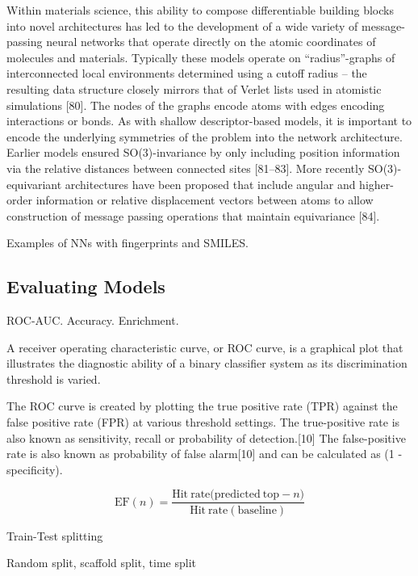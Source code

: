 Within materials science, this ability to compose differentiable building blocks into novel architectures has led to the development of a wide variety of message-passing neural networks that operate directly on the atomic coordinates of molecules and materials. Typically these models operate on “radius”-graphs of interconnected local environments determined using a cutoff radius – the resulting data structure closely mirrors that of Verlet lists used in atomistic simulations [80]. The nodes of the graphs encode atoms with edges encoding interactions or bonds. As with shallow descriptor-based models, it is important to encode the underlying symmetries of the problem into the network architecture. Earlier models ensured SO(3)-invariance by only including position information via the relative distances between connected sites [81–83]. More recently SO(3)-equivariant architectures have been proposed that include angular and higher-order information or relative displacement vectors between atoms to allow construction of message passing operations that maintain equivariance [84].

Examples of NNs with fingerprints and SMILES.

\subsection{Evaluating Models}

ROC-AUC. Accuracy. Enrichment.

A receiver operating characteristic curve, or ROC curve, is a graphical plot that illustrates the diagnostic ability of a binary classifier system as its discrimination threshold is varied.

The ROC curve is created by plotting the true positive rate (TPR) against the false positive rate (FPR) at various threshold settings. The true-positive rate is also known as sensitivity, recall or probability of detection.[10] The false-positive rate is also known as probability of false alarm[10] and can be calculated as (1 - specificity).

\begin{equation}
    \mathrm{EF}(n) = \frac{\mathrm{Hit\: rate (predicted\: top - }n)}{\mathrm{Hit\: rate (baseline)}}
\end{equation}

Train-Test splitting

Random split, scaffold split, time split

